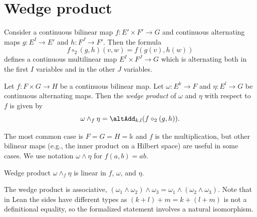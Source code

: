 \section{Wedge product}%
\label{sec:wedge-product}

\begin{definition}%
  \label{def:clm-comp2-cam}
  Consider a continuous bilinear map \(f \colon E' \times F' \to G\)
  and continuous alternating maps \(g\colon E^{I}\to E'\) and \(h\colon F^{J}\to F'\).
  Then the formula
  \[
    f \circ_{2} (g, h)(v, w) = f(g(v), h(w))
  \]
  defines a continuous multilinear map \(E^{I}\times F^{J}\to G\)
  which is alternating both in the first \(I\) variables and in the other \(J\) variables.
\end{definition}

\begin{definition}%
  \label{def:cam-wedge}
  Let \(f \colon F \times G \to H\) be a continuous bilinear map.
  Let \(\omega \colon E^{k} \to F\) and \(\eta\colon E^{l}\to G\) be continuous alternating maps.
  Then the \emph{wedge product} of \(\omega\) and \(\eta\) with respect to \(f\) is given by
  \[
    \omega \wedge_{f} \eta = \altAdd_{k, l}(f \circ_{2}(g, h)).
  \]
\end{definition}

The most common case is \(F = G = H = \mathbb k\) and \(f\) is the multiplication,
but other bilinear maps (e.g., the inner product on a Hilbert space) are useful in some cases.
We use notation \(\omega \wedge \eta\) for \(f(a, b) = ab\).


\begin{theorem}%
  \label{thm:wedge-clm3}
  Wedge product \(\omega \wedge_{f} \eta\) is linear in \(f\), \(\omega\), and \(\eta\).
\end{theorem}

\begin{theorem}%
  \label{thm:wedge-assoc}
  The wedge product is associative, \((\omega_{1}\wedge \omega_{2})\wedge \omega_{3} = \omega_{1}\wedge (\omega_{2}\wedge \omega_{3})\).
  Note that in Lean the sides have different types as \((k + l) + m = k + (l + m)\) is not a definitional equality,
  so the formalized statement involves a natural isomorphism.
\end{theorem}

